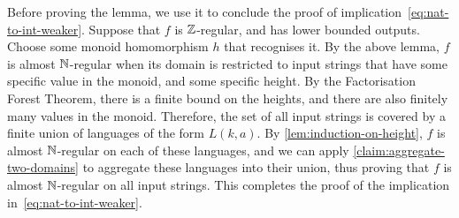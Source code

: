Before proving the lemma, we use it to conclude the proof of implication~\eqref{eq:nat-to-int-weaker}. Suppose that $f$ is ${\mathbb Z}$-regular, and has lower bounded outputs. Choose some monoid homomorphism $h$ that recognises it. By the above lemma, $f$ is almost ${\mathbb N}$-regular when its domain is restricted to input strings that have some specific value in the monoid, and some specific height. By the Factorisation Forest Theorem, there is a finite bound on the heights, and there are also finitely many values in the monoid. Therefore, the set of all input strings is covered by a finite union of languages of the form $L(k,a)$. By \cref{lem:induction-on-height}, $f$ is almost ${\mathbb N}$-regular on each of these languages, and we can apply  \cref{claim:aggregate-two-domains} to aggregate these languages into their union, thus proving that  $f$ is almost ${\mathbb N}$-regular on all input strings. This completes the proof of the implication in~\eqref{eq:nat-to-int-weaker}.

